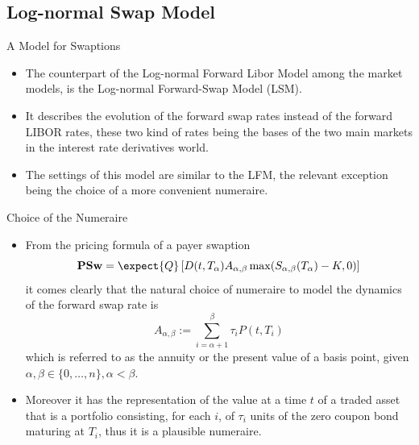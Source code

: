 \documentclass{beamer}
\begin{document}
\subsection{Log-normal Swap Model}
\begin{frame}{A Model for Swaptions}
	\begin{itemize}
		\item<1-> The counterpart of the Log-normal Forward Libor Model among the market models, is the \textcolor{maincolor}{Log-normal Forward-Swap Model (LSM)}.
		\item<2-> It describes the evolution of the forward swap rates instead of the forward LIBOR rates, these two kind of rates being the bases of the two main markets in the interest rate derivatives world.
		\item<3-> The settings of this model are similar to the LFM, the \textcolor{maincolor}{relevant exception being the choice of a more convenient numeraire}.
	\end{itemize}
\end{frame}

\begin{frame}{Choice of the Numeraire}
	\begin{itemize}
		\item<1-> From the pricing formula of a payer swaption
		\begin{equation*}
			\textbf{PSw}=\expect{Q}\left[D(t,T_\alpha)A_{\alpha,\beta}\max(S_{\alpha,\beta}(T_\alpha)-K, 0)\right]
		\end{equation*}
		it comes clearly that the natural choice of numeraire to model the dynamics of the forward swap rate is
		\begin{equation*}
			A_{\alpha,\beta} := \sum^\beta_{i=\alpha+1}\tau_i P(t, T_i)
		\end{equation*}
		which is referred to as the \textcolor{maincolor}{annuity} or the \textcolor{maincolor}{present value of a basis point}, given $\alpha, \beta \in \{0,\ldots, n\}, \alpha < \beta$.
		\item<2-> Moreover it has the representation of the value at a time $t$ of a traded asset that is a portfolio consisting, for each $i$, of $\tau_i$ units of the zero coupon bond maturing at $T_i$, thus it is a plausible numeraire.
	\end{itemize}
\end{frame}
\end{document}
